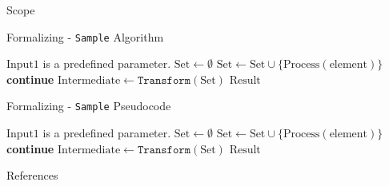 \documentclass{beamer}
\begin{document}
\appendix
					
\begin{frame}[label=scope]{Scope \hyperlink{objectives}{}}
	\note{}
\end{frame}

\begin{frame}[label=algo1]{Formalizing - \texttt{Sample} Algorithm \hyperlink{process1}{}}
	\begin{algorithm}[H]
		\small
		\caption{$(\text{Result}) \gets \texttt{Sample}(\text{Input1})$}
		\label{alg:algo1}
		\begin{algorithmic}[1]
			\Require $\text{Input1}$ is a predefined parameter.
			\State $\text{Set} \gets \emptyset$
			\State $\text{Set} \gets \text{Set} \cup \{\text{Process}(\text{element})\}$
			\Else
			\State \textbf{continue}
			\EndIf
			\EndFor
			\State $\text{Intermediate} \gets \texttt{Transform}(\text{Set})$
			\State \Return $\text{Result}$
		\end{algorithmic}
	\end{algorithm}
	\note{}
\end{frame}
	
\begin{frame}[label=pseudocode1]{Formalizing - \texttt{Sample} Pseudocode \hyperlink{process1}{}}
	\begin{algorithm}[H]
		\small
		\caption{$(\text{Result}) \gets \texttt{Sample}(\text{Input1})$}
		\label{alg:pseudocode1}
		\begin{algorithmic}[1]
			\Require $\text{Input1}$ is a predefined parameter.
			\State $\text{Set} \gets \emptyset$
			\State $\text{Set} \gets \text{Set} \cup \{\text{Process}(\text{element})\}$
			\Else
			\State \textbf{continue}
			\EndIf
			\EndFor
			\State $\text{Intermediate} \gets \texttt{Transform}(\text{Set})$
			\State \Return $\text{Result}$
		\end{algorithmic}
	\end{algorithm}
	\note{}
\end{frame}



\begin{frame}{References}
	\printbibliography[heading=none]
\end{frame}
					
\end{document}
